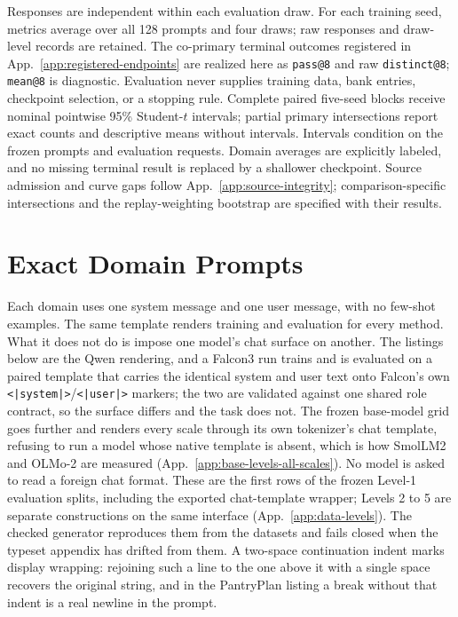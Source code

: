 \documentclass{article}
\newcommand{\1}{\mathbf 1}
\theoremstyle{remark}
\theoremstyle{definition}
\theoremstyle{plain}
\begin{document}
Responses are independent within each evaluation draw. For each training
seed, metrics average over all 128 prompts and four draws; raw responses
and draw-level records are retained. The co-primary terminal outcomes
registered in App.~\ref{app:registered-endpoints} are realized here as
\texttt{pass@8} and raw \texttt{distinct@8}; \texttt{mean@8} is diagnostic.
Evaluation never supplies training data, bank entries, checkpoint selection,
or a stopping rule. Complete paired five-seed blocks receive nominal
pointwise 95\% Student-$t$ intervals; partial primary intersections report
exact counts and descriptive means without intervals. Intervals condition
on the frozen prompts and evaluation requests. Domain averages are
explicitly labeled, and no missing terminal result is replaced by a
shallower checkpoint. Source admission and curve gaps follow
App.~\ref{app:source-integrity}; comparison-specific intersections and
the replay-weighting bootstrap are specified with their results.


\section{Exact Domain Prompts}
\label{app:prompts}

Each domain uses one system message and one user message, with no few-shot
examples. The same template renders training and evaluation for every
method. What it does not do is impose one model's chat surface on another.
The listings below are the Qwen rendering, and a Falcon3 run trains and is
evaluated on a paired template that carries the identical system and user
text onto Falcon's own \texttt{<|system|>}/\texttt{<|user|>} markers; the two
are validated against one shared role contract, so the surface differs and
the task does not. The frozen base-model grid goes further and renders every
scale through its own tokenizer's chat template, refusing to run a model
whose native template is absent, which is how SmolLM2 and OLMo-2 are measured
(App.~\ref{app:base-levels-all-scales}). No model is asked to read a foreign
chat format. These are the first rows of the frozen Level-1 evaluation splits,
including the exported chat-template wrapper; Levels 2 to 5 are separate
constructions on the same interface (App.~\ref{app:data-levels}). The checked
generator  reproduces them from the
datasets and fails closed when the typeset appendix has drifted from them.
A two-space continuation indent marks display wrapping: rejoining such a line
to the one above it with a single space recovers the original string, and in
the PantryPlan listing a break without that indent is a real newline in the
prompt.
\end{document}

